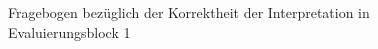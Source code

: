 \begin{figure}[htbp]
	\centering
	\caption{Fragebogen bezüglich der Korrektheit der Interpretation in Evaluierungsblock 1}
	\label{fig:img_AnhangEmpirie_fb1_3-01}
\end{figure}


